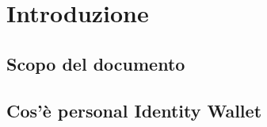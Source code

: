 \section{Introduzione}

\subsection{Scopo del documento}

\subsection{Cos'è personal Identity Wallet}
